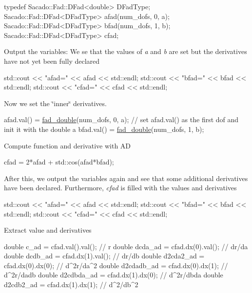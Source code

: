 \begin{DoxyCode}
\textcolor{keyword}{typedef} Sacado::Fad::DFad<double> DFadType;
Sacado::Fad::DFad<DFadType> afad(num\_dofs, 0, a);
Sacado::Fad::DFad<DFadType> bfad(num\_dofs, 1, b);
Sacado::Fad::DFad<DFadType> cfad;
\end{DoxyCode}
 Output the variables\+: We se that the values of {\itshape a} and {\itshape b} are set but the derivatives have not yet been fully declared 
\begin{DoxyCode}
std::cout << \textcolor{stringliteral}{"afad="} << afad << std::endl;
std::cout << \textcolor{stringliteral}{"bfad="} << bfad << std::endl;
std::cout << \textcolor{stringliteral}{"cfad="} << cfad << std::endl;
\end{DoxyCode}
 Now we set the \char`\"{}inner\char`\"{} derivatives. 
\begin{DoxyCode}
afad.val() = \hyperlink{example__code__to__be__documented_8cc_a868b94676739e612d9c95940e70892a9}{fad\_double}(num\_dofs, 0, a); \textcolor{comment}{// set afad.val() as the first dof and init it with the
       double a}
bfad.val() = \hyperlink{example__code__to__be__documented_8cc_a868b94676739e612d9c95940e70892a9}{fad\_double}(num\_dofs, 1, b);
\end{DoxyCode}
 Compute function and derivative with AD 
\begin{DoxyCode}
cfad = 2*afad + std::cos(afad*bfad);
\end{DoxyCode}
 After this, we output the variables again and see that some additional derivatives have been declared. Furthermore, {\itshape cfad} is filled with the values and derivatives 
\begin{DoxyCode}
std::cout << \textcolor{stringliteral}{"afad="} << afad << std::endl;
std::cout << \textcolor{stringliteral}{"bfad="} << bfad << std::endl;
std::cout << \textcolor{stringliteral}{"cfad="} << cfad << std::endl;
\end{DoxyCode}
 Extract value and derivatives 
\begin{DoxyCode}
\textcolor{keywordtype}{double} c\_ad = cfad.val().val();       \textcolor{comment}{// r}
\textcolor{keywordtype}{double} dcda\_ad = cfad.dx(0).val();    \textcolor{comment}{// dr/da}
\textcolor{keywordtype}{double} dcdb\_ad = cfad.dx(1).val();    \textcolor{comment}{// dr/db}
\textcolor{keywordtype}{double} d2cda2\_ad = cfad.dx(0).dx(0);  \textcolor{comment}{// d^2r/da^2}
\textcolor{keywordtype}{double} d2cdadb\_ad = cfad.dx(0).dx(1); \textcolor{comment}{// d^2r/dadb}
\textcolor{keywordtype}{double} d2cdbda\_ad = cfad.dx(1).dx(0); \textcolor{comment}{// d^2r/dbda}
\textcolor{keywordtype}{double} d2cdb2\_ad = cfad.dx(1).dx(1);  \textcolor{comment}{// d^2/db^2}
\end{DoxyCode}
